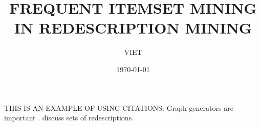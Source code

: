 \documentclass[mscthesis,english,oneside,biblatex]{uefcsthesis}
\title{FREQUENT ITEMSET MINING IN REDESCRIPTION MINING} %
\author{VIET}{TA} %
\date{\monthYearDateFormat\today}
\begin{document}
\maketitle
\begin{abstract}
  
\end{abstract}

\printglossary[type=\acronymtype, toctitle=Acronyms]

\frontmatter
\tableofcontents
\mainmatter



THIS IS AN EXAMPLE OF USING CITATIONS:
Graph generators are important \citep{metzler18random}.
\citet{kalofolias18from} discuss sets of redescriptions.

\printbibliography[heading=bibintoc]

\backmatter %
\end{document}
